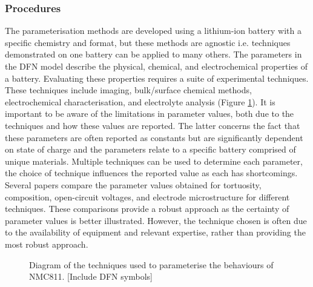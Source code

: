 \documentclass[aps,prb,twocolumn,superscriptaddress,reprint]{revtex4-1}
\begin{document}
\subsubsection{Procedures}
The parameterisation methods are developed using a lithium-ion battery with a specific chemistry and format, but these methods are agnostic i.e. techniques demonstrated on one battery can be applied to many others. The parameters in the DFN model describe the physical, chemical, and electrochemical properties of a battery. Evaluating these properties requires a suite of experimental techniques. These techniques include imaging, bulk/surface chemical methods, electrochemical characterisation, and electrolyte analysis (Figure \ref{fig:param_pie}). \cite{Waldmann2016} It is important to be aware of the limitations in parameter values, both due to the techniques and how these values are reported. The latter concerns the fact that these parameters are often reported as constants but are significantly dependent on state of charge and the parameters relate to a specific battery comprised of unique materials. Multiple techniques can be used to determine each parameter, the choice of technique influences the reported value as each has shortcomings. Several papers compare the parameter values obtained for tortuosity, composition, open-circuit voltages, and electrode microstructure for different techniques. \cite{Nguyen2020,Chen2020, Landesfeind2018, Barai2019} These comparisons provide a robust approach as the certainty of parameter values is better illustrated. However, the technique chosen is often due to the availability of equipment and relevant expertise, rather than providing the most robust approach.

\begin{figure}[h]
    \centering
    \caption{\label{fig:param_pie} Diagram of the techniques used to parameterise the behaviours of NMC811. [Include DFN symbols]} 
\end{figure}
\end{document}
